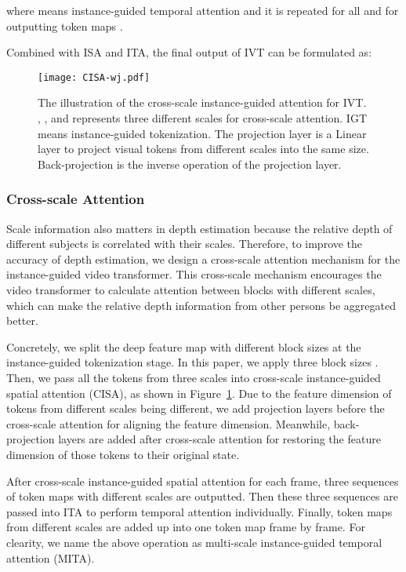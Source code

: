 \documentclass[sigconf]{acmart}
\begin{document}
where  means instance-guided temporal attention and it is repeated for all  and  for outputting token maps .

Combined with ISA and ITA, the final output of IVT can be formulated as:



\begin{figure}[!t]
\centering
\texttt{[image: CISA-wj.pdf]}
\vspace{-0.5cm}

\caption{The illustration of the cross-scale instance-guided attention for IVT. , , and  represents three different scales for cross-scale attention. IGT means instance-guided tokenization. The projection layer is a Linear layer to project visual tokens from different scales into the same size. Back-projection is the inverse operation of the projection layer.}
\label{fig:crossattention}
\end{figure}

\subsubsection{Cross-scale Attention}
Scale information also matters in depth estimation because the relative depth of different subjects is correlated with their scales. Therefore, to improve the accuracy of depth estimation, we design a cross-scale attention mechanism for the instance-guided video transformer. This cross-scale mechanism encourages the video transformer to calculate attention between blocks with different scales, which can make the relative depth information from other persons be aggregated better.

Concretely, we split the deep feature map  with different block sizes at the instance-guided tokenization stage. In this paper, we apply three block sizes . Then, we pass all the tokens from three scales into cross-scale instance-guided spatial attention (CISA), as shown in Figure~\ref{fig:crossattention}. Due to the feature dimension of tokens from different scales being different, we add projection layers before the cross-scale attention for aligning the feature dimension. Meanwhile, back-projection layers are added after cross-scale attention for restoring the feature dimension of those tokens to their original state.

After cross-scale instance-guided spatial attention for each frame, three sequences of token maps with different scales are outputted. Then these three sequences are passed into ITA to perform temporal attention individually. Finally, token maps from different scales are added up into one token map frame by frame. For clearity, we name the above operation as multi-scale instance-guided temporal attention (MITA).
\end{document}
